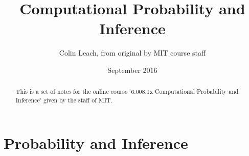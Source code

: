 



\title{Computational Probability and Inference}
\author{Colin Leach, from original by MIT course staff}
\date{September 2016}
\maketitle

\begin{abstract}
This is a set of notes for the online course `6.008.1x Computational Probability and Inference' given by the staff of MIT.
\end{abstract}

\tableofcontents

\setlength{\parindent}{0pt}
\setlength{\parskip}{0.5em}
\setlength{\intextsep}{2mm}

\newpage
\section{Probability and Inference}








